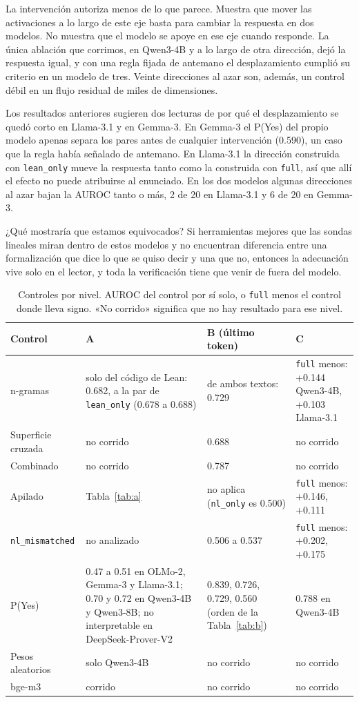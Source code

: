 \documentclass[10pt]{article}
\newcommand{\vr}[1]{\texttt{#1}}
\begin{document}
La intervención autoriza menos de lo que parece. Muestra que mover las activaciones a lo largo de este eje basta para
cambiar la respuesta en dos modelos. No muestra que el modelo se apoye en ese eje cuando responde. La única ablación
que corrimos, en Qwen3-4B y a lo largo de otra dirección, dejó la respuesta igual, y con una regla fijada de antemano
el desplazamiento cumplió su criterio en un modelo de tres. Veinte direcciones al azar son, además, un control débil
en un flujo residual de miles de dimensiones.

Los resultados anteriores sugieren dos lecturas de por qué el desplazamiento se quedó corto en Llama-3.1 y en Gemma-3.
En Gemma-3 el P(Yes) del propio modelo apenas separa los pares antes de cualquier intervención (0.590), un caso que la
regla había señalado de antemano. En Llama-3.1 la dirección construida con \vr{lean\_only} mueve la respuesta tanto
como la construida con \vr{full}, así que allí el efecto no puede atribuirse al enunciado. En los dos modelos algunas
direcciones al azar bajan la AUROC tanto o más, 2 de 20 en Llama-3.1 y 6 de 20 en Gemma-3.

¿Qué mostraría que estamos equivocados? Si herramientas mejores que las sondas lineales miran dentro de estos modelos
y no encuentran diferencia entre una formalización que dice lo que se quiso decir y una que no, entonces la adecuación
vive solo en el lector, y toda la verificación tiene que venir de fuera del modelo.

\begin{table}[h]
\centering
\caption{Controles por nivel. AUROC del control por sí solo, o \vr{full} menos el control donde lleva signo. «No corrido» significa que no hay resultado para ese nivel.}
\label{tab:controlesnivel}
\vspace{2pt}
{\small
\begin{tabularx}{\linewidth}{@{}lXXX@{}}
\toprule
Control & A & B (último token) & C\\
\midrule
n-gramas & solo del código de Lean: 0.682, a la par de \vr{lean\_only} (0.678 a 0.688) & de ambos textos: 0.729 & \vr{full} menos: +0.144 Qwen3-4B, +0.103 Llama-3.1\\
Superficie cruzada & no corrido & 0.688 & no corrido\\

Combinado & no corrido & 0.787 & no corrido\\
Apilado & Tabla~\ref{tab:a} & no aplica (\vr{nl\_only} es 0.500) & \vr{full} menos: +0.146, +0.111\\
\vr{nl\_mismatched} & no analizado & 0.506 a 0.537 & \vr{full} menos: +0.202, +0.175\\
P(Yes) & 0.47 a 0.51 en OLMo-2, Gemma-3 y Llama-3.1; 0.70 y 0.72 en Qwen3-4B y Qwen3-8B; no interpretable en DeepSeek-Prover-V2 & 0.839, 0.726, 0.729, 0.560 (orden de la Tabla~\ref{tab:b}) & 0.788 en Qwen3-4B\\
Pesos aleatorios & solo Qwen3-4B & no corrido & no corrido\\
bge-m3 & corrido & no corrido & no corrido\\
\bottomrule
\end{tabularx}}
\end{table}
\end{document}
